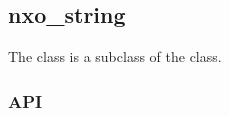 %
%
%
%
%              

\subsection{nxo\_string}
\label{nxo_string}

The  class is a subclass of the  class.

\subsubsection{API}
